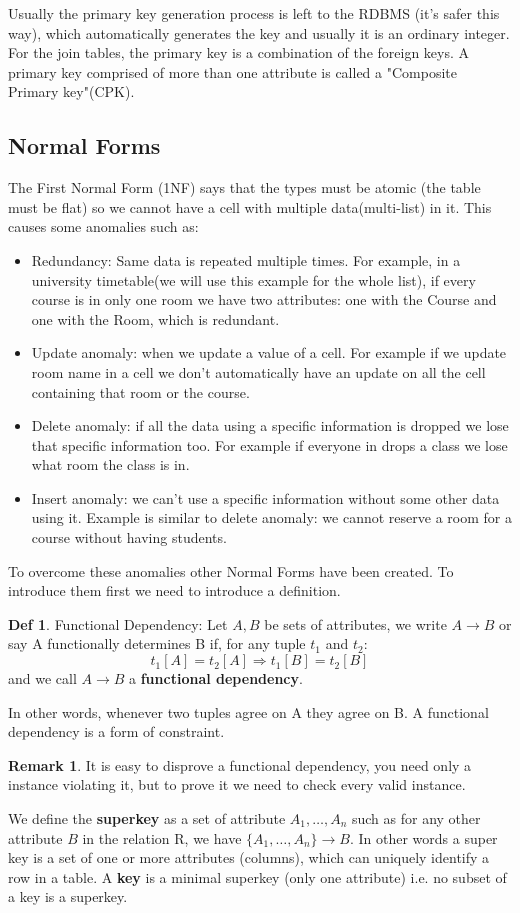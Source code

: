 \documentclass[a4page, 11pt]{article}
\theoremstyle{definition}
\newtheorem*{definition}{Def}
\newtheorem*{remark}{Remark}
\begin{document}
Usually the primary key generation process is left to the RDBMS (it's safer this way), which automatically generates the key and usually it is an ordinary integer.
For the join tables, the primary key is a combination of the foreign keys. A primary key comprised of more than one attribute is called a "Composite Primary key"(CPK).
\subsection{Normal Forms}
The First Normal Form (1NF) says that the types must be atomic (the table must be flat) so we cannot have a cell with multiple data(multi-list) in it. 
This causes some anomalies such as: 
\begin{itemize}[noitemsep]
	\item Redundancy: Same data is repeated multiple times. For example, in a university timetable(we will use this example for the whole list), if every course is in only one room we have two attributes: one with the Course and one with the Room, which is redundant.
	\item Update anomaly: when we update a value of a cell. For example if we update room name in a cell we don't automatically have an update on all the cell containing that room or the course.
	\item Delete anomaly: if all the data using a specific information is dropped we lose that specific information too. For example if everyone in drops a class we lose what room the class is in.
	\item Insert anomaly: we can't use a specific information without some other data using it. Example is similar to delete anomaly: we cannot reserve a room for a course without having students.
\end{itemize}

To overcome these anomalies other Normal Forms have been created. To introduce them first we need to introduce a definition.\begin{definition}{Functional Dependency:}
Let $A,B$ be sets of attributes, we write $A \rightarrow B$ or say A functionally determines B if, for any tuple $t_1$ and $t_2$:
$$t_1[A]=t_2[A] \Rightarrow t_1[B]=t_2[B]$$
and we call $A \rightarrow B$ a \textbf{functional dependency}.
\end{definition}
In other words, whenever two tuples agree on A they agree on B.
A functional dependency is a form of constraint.
 \begin{remark}
It is easy to disprove a functional dependency, you need only a instance violating it, but to prove it we need to check every valid instance.
\end{remark}
We define the \textbf{superkey} as a set of attribute $A_1,\hdots, A_n$ such as for any other attribute $B$ in the relation R, we have $\{A_1,\hdots,A_n\} \rightarrow B$. In other words a super key is a set of one or more attributes (columns), which can uniquely identify a row in a table.
A \textbf{key} is a minimal superkey (only one attribute) i.e. no subset of a key is a superkey.
\end{document}
